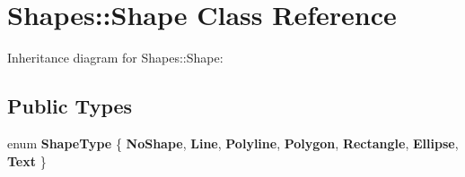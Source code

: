 \hypertarget{class_shapes_1_1_shape}{}\section{Shapes\+::Shape Class Reference}
\label{class_shapes_1_1_shape}


Inheritance diagram for Shapes\+::Shape\+:
\subsection*{Public Types}
\begin{DoxyCompactItemize}
\item 
\mbox{\label{class_shapes_1_1_shape_aa6068ecff97f34fa10dcda56af552b12}} 
enum {\bfseries Shape\+Type} \{ \newline
{\bfseries No\+Shape}, 
{\bfseries Line}, 
{\bfseries Polyline}, 
{\bfseries Polygon}, 
\newline
{\bfseries Rectangle}, 
{\bfseries Ellipse}, 
{\bfseries Text}
 \}
\end{DoxyCompactItemize}
